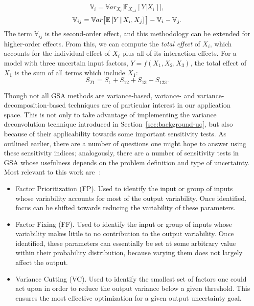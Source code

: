 \begin{equation}\label{eq:interaction-effect}
    \mathbb{V}_i = \mathbb{V}ar_{X_i}\big[  \mathbb{E}_{X_{\sim i}}\left[ Y | X_i \right] \big],
\end{equation}
\begin{equation*}
    \mathbb{V}_{ij} = \mathbb{V}ar\big[ \mathbb{E}\left[ Y \, | \, X_i,X_j\right] \big] - \mathbb{V}_i - \mathbb{V}_j.
\end{equation*}
The term $\mathbb{V}_{ij}$ is the second-order effect, and this methodology can be extended for higher-order effects. From this, we can compute the \textit{total effect} of $X_i$, which accounts for the individual effect of $X_i$ plus all of its interaction effects. For a model with three uncertain input factors, $Y = f(X_1,X_2,X_3)$, the total effect of $X_1$ is the sum of all terms which include $X_1$:
\begin{equation}\label{eq:total-effect-si}
    S_{T1} = S_1 + S_{12} + S_{13} + S_{123} .
\end{equation}

Though not all GSA methods are variance-based, variance- and variance-decomposition-based techniques are of particular interest in our application space. This is not only to take advantage of implementing the variance deconvolution technique introduced in Section~\ref{sec:background-uq}, but also because of their applicability towards some important sensitivity tests. As outlined earlier, there are a number of questions one might hope to answer using these sensitivity indices; analogously, there are a number of sensitivity tests in GSA whose usefulness depends on the problem definition and type of uncertainty. Most relevant to this work are~\cite{saltelliGSA}:
\begin{itemize}
    \item Factor Prioritization (FP). Used to identify the input or group of inputs whose variability accounts for most of the output variability. Once identified, focus can be shifted towards reducing the variability of these parameters.
    \item Factor Fixing (FF). Used to identify the input or group of inputs whose variability makes little to no contribution to the output variability. Once identified, these parameters can essentially be set at some arbitrary value within their probability distribution, because varying them does not largely affect the output.
    \item Variance Cutting (VC). Used to identify the smallest set of factors one could act upon in order to reduce the output variance below a given threshold. This ensures the most effective optimization for a given output uncertainty goal.
\end{itemize}

